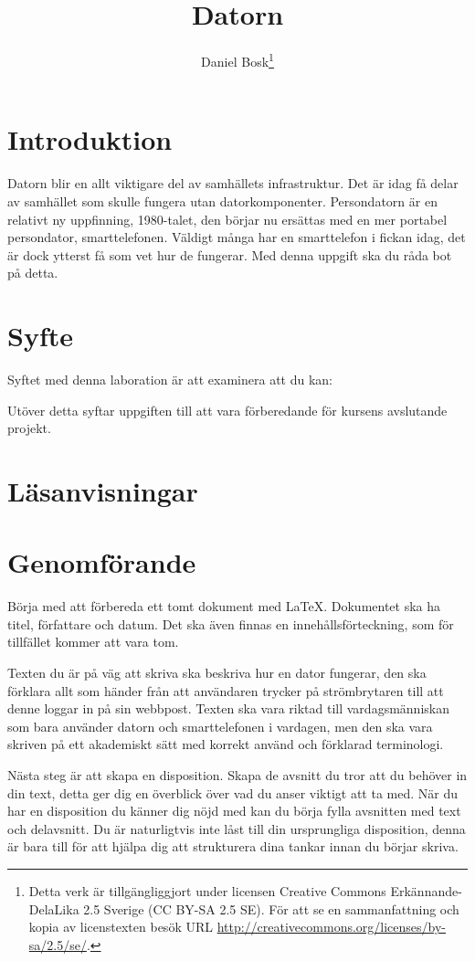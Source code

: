\documentclass[a4paper]{miunasgn}
\title{Datorn}
\author{Daniel Bosk\footnote{%
	Detta verk är tillgängliggjort under licensen Creative Commons 
	Erkännande-DelaLika 2.5 Sverige (CC BY-SA 2.5 SE).
	För att se en sammanfattning och kopia av licenstexten besök URL 
	\url{http://creativecommons.org/licenses/by-sa/2.5/se/}.
}}
\date{\svnId}
\begin{document}
\maketitle
\thispagestyle{foot}
\tableofcontents


\section{Introduktion}
\label{sec:Introduktion}
Datorn blir en allt viktigare del av samhällets infrastruktur.
Det är idag få delar av samhället som skulle fungera utan datorkomponenter.
Persondatorn är en relativt ny uppfinning, 1980-talet, den börjar nu ersättas 
med en mer portabel persondator, smarttelefonen.
Väldigt många har en smarttelefon i fickan idag, det är dock ytterst få som vet 
hur de fungerar.
Med denna uppgift ska du råda bot på detta.


\section{Syfte}
\label{sec:Syfte}
\noindent
Syftet med denna laboration är att examinera att du kan:
\begin{itemize}
  
\end{itemize}
Utöver detta syftar uppgiften till att vara förberedande för kursens avslutande 
projekt.


\section{Läsanvisningar}
\label{sec:Lasanvisningar}



\section{Genomförande}
\label{sec:Genomforande}
Börja med att förbereda ett tomt dokument med LaTeX.
Dokumentet ska ha titel, författare och datum.
Det ska även finnas en innehållsförteckning, som för tillfället kommer att vara 
tom.

Texten du är på väg att skriva ska beskriva hur en dator fungerar, den ska 
förklara allt som händer från att användaren trycker på strömbrytaren till att 
denne loggar in på sin webbpost.
Texten ska vara riktad till vardagsmänniskan som bara använder datorn och 
smarttelefonen i vardagen, men den ska vara skriven på ett akademiskt sätt med 
korrekt använd och förklarad terminologi.

Nästa steg är att skapa en disposition.
Skapa de avsnitt du tror att du behöver in din text, detta ger dig en överblick 
över vad du anser viktigt att ta med.
När du har en disposition du känner dig nöjd med kan du börja fylla avsnitten 
med text och delavsnitt.
Du är naturligtvis inte låst till din ursprungliga disposition, denna är bara 
till för att hjälpa dig att strukturera dina tankar innan du börjar skriva.
\end{document}

